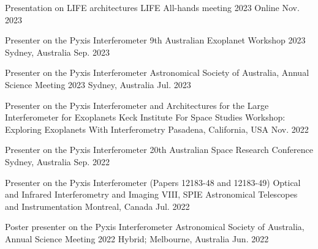 

\begin{cventries}

    \cventry
    {Presentation on LIFE architectures} %
    {LIFE All-hands meeting 2023} %
    {Online} %
    {Nov. 2023} %
    {}
      \vspace{-0.2cm}  

    \cventry
    {Presenter on the Pyxis Interferometer} %
    {9th Australian Exoplanet Workshop 2023} %
    {Sydney, Australia} %
    {Sep. 2023} %
    {}
      \vspace{-0.2cm}  
    
    \cventry
    {Presenter on the Pyxis Interferometer} %
    {Astronomical Society of Australia, Annual Science Meeting 2023} %
    {Sydney, Australia} %
    {Jul. 2023} %
    {}
      \vspace{-0.2cm}  
      
       
       \cventry
    {Presenter on the Pyxis Interferometer and Architectures for the Large Interferometer for Exoplanets} %
    {Keck Institute For Space Studies Workshop: Exploring Exoplanets With Interferometry} %
    {Pasadena, California, USA} %
    {Nov. 2022} %
    {}
    \vspace{-0.2cm}
      
      \cventry
    {Presenter on the Pyxis Interferometer} %
    {20th Australian Space Research Conference} %
    {Sydney, Australia} %
    {Sep. 2022} %
    {}
    \vspace{-0.2cm}
    
       \cventry
    {Presenter on the Pyxis Interferometer (Papers 12183-48 and 12183-49)} %
    {Optical and Infrared Interferometry and Imaging VIII, SPIE Astronomical Telescopes and Instrumentation} %
    {Montreal, Canada} %
    {Jul. 2022} %
    {}
    \vspace{-0.2cm}
    
    \cventry
    {Poster presenter on the Pyxis Interferometer} %
    {Astronomical Society of Australia, Annual Science Meeting 2022} %
    {Hybrid; Melbourne, Australia} %
    {Jun. 2022} %
    {}
    \vspace{-0.2cm}    
    

\end{cventries}
